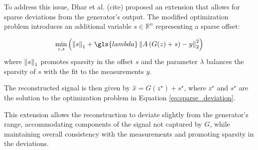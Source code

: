 To address this issue, Dhar et al. (cite) proposed an extension that allows for sparse deviations from the generator's output.
The modified optimization problem introduces an additional variable $s \in \mathbb{R}^n$ representing a sparse offset:

\begin{equation}
    \min_{z, s}{\left(\norm{s}_1 + \gls{lambda} \norm{A \left( G(z) + s \right) - y}_2^2 \right)}
    \label{eq:sparse_deviation}
\end{equation}
where $\left\lVert s\right\rVert_1$ promotes sparsity in the offset $s$ and the parameter $\lambda$ balances the sparsity of $s$ with the fit to the measurements $y$.

The reconstructed signal is then given by $\hat{x} = G(z^\star) + s^\star$, where $z^\star$ and $s^\star$ are the solution to the optimization problem in Equation \ref{eq:sparse_deviation}.

This extension allows the reconstruction to deviate slightly from the generator's range, accommodating components of the signal not captured by $G$, while maintaining overall consistency with the measurements and promoting sparsity in the deviations.


